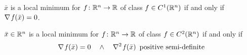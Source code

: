 \begin{prop}
	$\bar{x}$ is a local minimum for $f\colon\mathbb{R}^n\to\mathbb{R}$ of class $f\in C^1(\mathbb{R}^n)$ if and only if $\nabla\operatorname*{\mathit{f}}(\bar{x})=0$.
\end{prop}

\begin{prop}\label{prop:opt_second}
	$\bar{x}\in\mathbb{R}^n$ is a local minimum for $f\colon\mathbb{R}^n\to\mathbb{R}$ of class $f\in C^2(\mathbb{R}^n)$ if and only if
	\[\nabla\operatorname*{\mathit{f}}(\bar{x})=0\quad\wedge\quad \nabla^2\operatorname*{\mathit{f}}(\bar{x})\,\,\,\text{positive semi-definite}\]
\end{prop}

